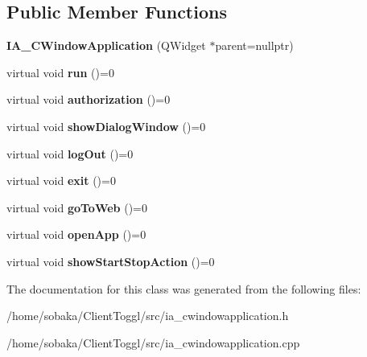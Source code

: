 \subsection*{Public Member Functions}
\begin{DoxyCompactItemize}
\item 
\mbox{\label{classIA__CWindowApplication_a741ba86d35b747159cac436a67b6af37}} 
{\bfseries I\+A\+\_\+\+C\+Window\+Application} (Q\+Widget $\ast$parent=nullptr)
\item 
\mbox{\label{classIA__CWindowApplication_a74b2bad2605c8d2eb388b7c659c7f82b}} 
virtual void {\bfseries run} ()=0
\item 
\mbox{\label{classIA__CWindowApplication_ac3ba03a7f53fe66fbd73823766c11cac}} 
virtual void {\bfseries authorization} ()=0
\item 
\mbox{\label{classIA__CWindowApplication_afb8e5c50368ddebcdfa50d401d1d70af}} 
virtual void {\bfseries show\+Dialog\+Window} ()=0
\item 
\mbox{\label{classIA__CWindowApplication_afcf57649c3569fbe259a1a2be398fc9b}} 
virtual void {\bfseries log\+Out} ()=0
\item 
\mbox{\label{classIA__CWindowApplication_a945d71115a9b3a4260ebcd5c005af94c}} 
virtual void {\bfseries exit} ()=0
\item 
\mbox{\label{classIA__CWindowApplication_a99d893597aca62706c6ec59f620834d1}} 
virtual void {\bfseries go\+To\+Web} ()=0
\item 
\mbox{\label{classIA__CWindowApplication_a63075bc33da22080ebfedce7f8641def}} 
virtual void {\bfseries open\+App} ()=0
\item 
\mbox{\label{classIA__CWindowApplication_a29b9be64fa2b5a7a0b4567c926e55863}} 
virtual void {\bfseries show\+Start\+Stop\+Action} ()=0
\end{DoxyCompactItemize}


The documentation for this class was generated from the following files\+:\begin{DoxyCompactItemize}
\item 
/home/sobaka/\+Client\+Toggl/src/ia\+\_\+cwindowapplication.\+h\item 
/home/sobaka/\+Client\+Toggl/src/ia\+\_\+cwindowapplication.\+cpp\end{DoxyCompactItemize}
